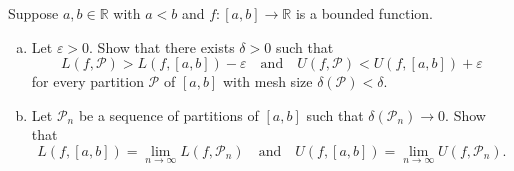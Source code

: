 \documentclass[11pt]{article}
\providecommand{\eps}{\varepsilon}
\providecommand{\RR}{\mathbb R}
\providecommand{\ii}{\item}
\begin{document}
\newpage

\begin{problem}
    Suppose $a,b\in\RR$ with $a<b$ and $f\colon[a,b]\to\RR$ is a bounded function.
    \begin{enumerate}[(a)]
        \ii Let $\eps > 0$. Show that there exists $\delta > 0$ such that
	\begin{equation*}
	    L(f,\mathcal P) > L(f,[a,b]) - \eps
	    \quad\text{and}\quad
	    U(f,\mathcal P) < U(f,[a,b]) + \eps
	\end{equation*}
	for every partition $\mathcal P$ of $[a,b]$
	with mesh size $\delta(\mathcal P) < \delta$.
	\ii Let $\mathcal P_n$ be a sequence of partitions of $[a,b]$
	such that $\delta(\mathcal P_n)\to 0$. Show that
	\begin{equation*}
	    L(f,[a,b]) = \lim_{n\to\infty} L(f,\mathcal P_n)
	    \quad\text{and}\quad
	    U(f,[a,b]) = \lim_{n\to\infty} U(f,\mathcal P_n).
	\end{equation*}
    \end{enumerate}
\end{problem}
\end{document}

